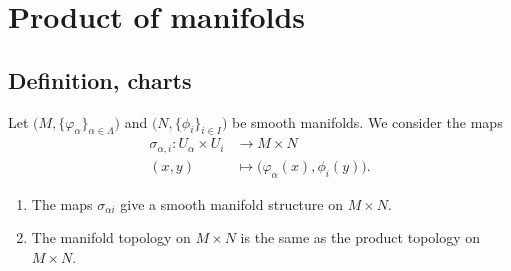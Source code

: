 

\section{Product of manifolds}

\subsection{Definition, charts}


\begin{propositionDef}      \label{DEFooYOLXooDPrnHa}
	Let \( \big( M,\{ \varphi_{\alpha} \}_{\alpha\in \Lambda} \big)\) and \( \big( N,\{ \phi_i \}_{i\in I} \big)\) be smooth manifolds. We consider the maps
	\begin{equation}
		\begin{aligned}
			\sigma_{\alpha,i}\colon U_{\alpha}\times U_i & \to M\times N                                       \\
			(x,y)                                        & \mapsto \big( \varphi_{\alpha}(x), \phi_i(y) \big).
		\end{aligned}
	\end{equation}
	\begin{enumerate}
		\item
		      The maps \( \sigma_{\alpha i}\) give a smooth manifold structure on \( M\times N\).
		\item
		      The manifold topology on \( M\times N\) is the same as the product topology on \( M\times N\).
	\end{enumerate}
\end{propositionDef}

